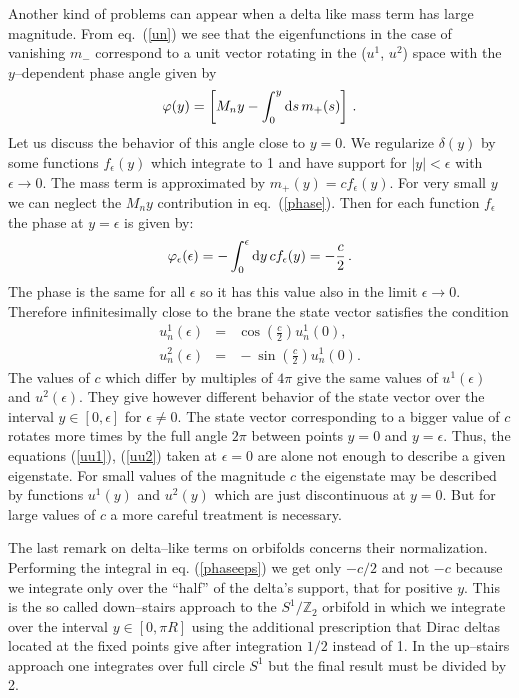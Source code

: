 \documentclass[a4paper,12pt]{article}
\def\de{\delta}
\def\eps{\epsilon}
\def\d{{\rm d}}
\def\ZZ{\mathbb Z}
\begin{document}
Another kind of problems can appear when a delta like mass term has
large magnitude. From eq.\ (\ref{un}) we see that the eigenfunctions
in the case of vanishing $m_-$ correspond to a unit vector rotating in
the ($u^1$, $u^2$) space with the $y$--dependent phase angle given by 
\begin{equation}
\varphi(y)=\left[M_ny-\int_0^y\d s\,m_+(s)\right]
\,.
\label{phase}
\end{equation}
Let us discuss the behavior of this angle close to $y=0$. We
regularize $\de(y)$ by some functions $f_\eps(y)$ which integrate to 1
and have support for $|y|<\eps$ with $\eps\to0$. The mass
term is approximated by $m_+(y)=cf_\eps(y)$. For very small
$y$ we can neglect the $M_ny$ contribution in eq.\ (\ref{phase}). 
Then for each function $f_\eps$ the phase at $y=\eps$ is given by:
\begin{equation}
\varphi_\eps(\eps)=-\int_0^\eps\d y\,cf_\eps(y)=-\frac{c}{2}
\,.
\label{phaseeps}
\end{equation}
The phase is the same for all $\eps$ so it has this value also in the
limit $\eps\to0$. Therefore infinitesimally close to the brane the
state vector satisfies the condition
\begin{eqnarray}
u^1_n(\eps)
\!\!\!&=&\!\!\!
\cos\left(\frac{c}{2}\right)u_n^1(0)
,\label{uu1}
\\[6pt]
u^2_n(\eps)
\!\!\!&=&\!\!\!
-\sin\left(\frac{c}{2}\right)u_n^1(0)
.
\label{uu2}
\end{eqnarray}
The values of $c$ which differ by multiples of $4\pi$ give the same
values of $u^1(\eps)$ and $u^2(\eps)$. They give however different
behavior of the state vector over the interval  $y\in[0,\eps]$ for
$\eps\ne0$. The state vector corresponding to a bigger value of $c$
rotates more times by the full angle $2\pi$ between points $y=0$ and
$y=\eps$. Thus, the equations (\ref{uu1}), (\ref{uu2}) taken at
$\eps=0$ are alone not enough to describe a given eigenstate. For
small values of the magnitude $c$ the eigenstate may be described by
functions $u^1(y)$ and $u^2(y)$ which are just discontinuous at
$y=0$. But for large values of $c$ a more careful treatment is
necessary. 


The last remark on delta--like terms on orbifolds concerns their
normalization. Performing the integral in eq. (\ref{phaseeps}) we get
only $-c/2$ and not $-c$ because we integrate only over the ``half''
of the delta's support, that for positive $y$. This is the so called 
down--stairs approach to 
the $S^1/\ZZ_2$ orbifold in which we integrate over the interval
$y\in[0,\pi R]$ using the additional prescription that Dirac deltas
located at the fixed points give after integration $1/2$ instead of
1. In the up--stairs approach one integrates over full circle $S^1$
but the final result must be divided by 2. 
\end{document}
